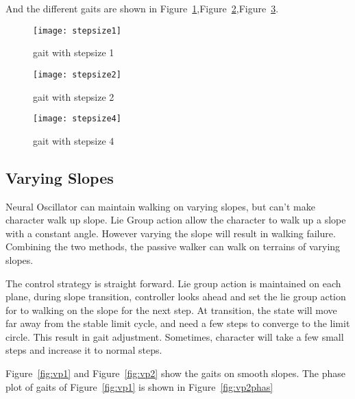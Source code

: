 And the different gaits are shown in Figure~\ref{fig:ssp1},Figure~\ref{fig:ssp2},Figure~\ref{fig:ssp3}.
\begin{figure}[!htbp]
  \begin{center}
      \texttt{[image: stepsize1]}
    \caption{gait with stepsize 1}
    \label{fig:ssp1}
\end{center}
\end{figure}

\begin{figure}[!htbp]
  \begin{center}
      \texttt{[image: stepsize2]}
    \caption{gait with stepsize 2}
    \label{fig:ssp2}
\end{center}
\end{figure}

\begin{figure}[!htbp]
  \begin{center}
      \texttt{[image: stepsize4]}
    \caption{gait with stepsize 4}
    \label{fig:ssp3}
\end{center}
\end{figure}







\subsection{Varying Slopes}
Neural Oscillator can maintain walking on varying slopes, but can't make character walk up slope.
Lie Group action allow the character to walk up a slope with a constant angle.
However varying the slope will result in walking failure.
Combining the two methods, the passive walker can walk on terrains of varying slopes.


The control strategy is straight forward.
Lie group action is maintained on each plane, during slope transition, controller looks ahead and set the lie group action for to walking on the slope for the next step.
At transition, the state will move far away from the stable limit cycle, and need a few steps to converge to the limit circle.
This result in gait adjustment.
Sometimes, character will take a few small steps and increase it to normal steps.


Figure~\ref{fig:vp1} and Figure~\ref{fig:vp2} show the gaits on smooth slopes.
The phase plot of gaits of Figure~\ref{fig:vp1} is shown in Figure~\ref{fig:vp2phas} 

